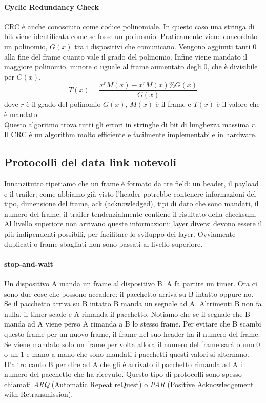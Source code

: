 \documentclass{article}
\begin{document}
\paragraph{Cyclic Redundancy Check} CRC è anche conosciuto come codice
polinomiale. In questo caso una stringa di bit viene identificata come se fosse
un polinomio. Praticamente viene concordato un polinomio, $G(x)$ tra i dispositivi che
comunicano. Vengono aggiunti tanti 0 alla fine del frame quanto vale il grado
del polinomio. Infine viene mandato il maggiore polinomio, minore o uguale al
frame aumentato degli 0, che è divisibile per $G(x)$.
\begin{equation}
	T(x) = \frac{x^{r}M(x) - x^rM(x) \% G(x)}{G(x)}
\end{equation}
dove $r$ è il grado del polinomio $G(x)$, $M(x)$ è il frame e $T(x)$ è il valore
che è mandato.\\
Questo algoritmo trova tutti gli errori in stringhe di bit di lunghezza massima
$r$. Il CRC è un algorithm molto efficiente e facilmente implementabile in
hardware.

\subsection{Protocolli del data link notevoli}
Innanzitutto ripetiamo che un frame è formato da tre field: un header, il
payload e il trailer; come abbiamo già visto l'header potrebbe contenere
informazioni del tipo, dimensione del frame, ack (acknowledged), tipi di dato
che sono mandati, il numero del frame; il trailer tendenzialmente contiene il
risultato della checksum. Al livello superiore non arrivano queste informazioni:
layer diversi devono essere il più indipendenti possibili, per facilitare lo
sviluppo dei layer.
Ovviamente duplicati o frame sbagliati non sono passati al livello superiore.

\paragraph{stop-and-wait} Un dispositivo A manda un frame al dispositivo B. A fa
partire un timer. Ora ci sono due cose che possono accadere: il pacchetto arriva
su B intatto oppure no. Se il pacchetto arriva su B intatto B manda un segnale
ad A. Altrimenti B non fa nulla, il timer scade e A rimanda il pacchetto.
Notiamo che se il segnale che B manda ad A viene perso A rimanda a B lo stesso
frame. Per evitare che B scambi questo frame per un nuovo frame, il frame nel
suo header ha il numero del frame. Se viene mandato solo un frame per volta
allora il numero del frame sarà o uno 0 o un 1 e mano a mano che sono mandati i
pacchetti questi valori si alternano. D'altro canto B per dire ad A che gli è
arrivato il pacchetto rimanda ad A il numero del pacchetto che ha ricevuto.
Questo tipo di protocolli sono spesso chiamati \textit{ARQ} (Automatic Repeat
reQuest) o \textit{PAR} (Positive Acknowledgement with Retransmission).
\end{document}
